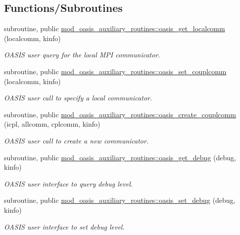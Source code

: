 \subsection*{Functions/\+Subroutines}
\begin{DoxyCompactItemize}
\item 
subroutine, public \hyperlink{namespacemod__oasis__auxiliary__routines_a905dc11bc7613c7ac94054cf92fc2736}{mod\+\_\+oasis\+\_\+auxiliary\+\_\+routines\+::oasis\+\_\+get\+\_\+localcomm} (localcomm, kinfo)
\begin{DoxyCompactList}\small\item\em O\+A\+S\+IS user query for the local M\+PI communicator. \end{DoxyCompactList}\item 
subroutine, public \hyperlink{namespacemod__oasis__auxiliary__routines_a42c3fe19a188de66499094e988c51938}{mod\+\_\+oasis\+\_\+auxiliary\+\_\+routines\+::oasis\+\_\+set\+\_\+couplcomm} (localcomm, kinfo)
\begin{DoxyCompactList}\small\item\em O\+A\+S\+IS user call to specify a local communicator. \end{DoxyCompactList}\item 
subroutine, public \hyperlink{namespacemod__oasis__auxiliary__routines_aede33b301679f532ecd300488358ab71}{mod\+\_\+oasis\+\_\+auxiliary\+\_\+routines\+::oasis\+\_\+create\+\_\+couplcomm} (icpl, allcomm, cplcomm, kinfo)
\begin{DoxyCompactList}\small\item\em O\+A\+S\+IS user call to create a new communicator. \end{DoxyCompactList}\item 
subroutine, public \hyperlink{namespacemod__oasis__auxiliary__routines_a940777065691d5eab0402b0bb40464c7}{mod\+\_\+oasis\+\_\+auxiliary\+\_\+routines\+::oasis\+\_\+get\+\_\+debug} (debug, kinfo)
\begin{DoxyCompactList}\small\item\em O\+A\+S\+IS user interface to query debug level. \end{DoxyCompactList}\item 
subroutine, public \hyperlink{namespacemod__oasis__auxiliary__routines_a71bf70a87b2d4ce86016bbb93d9edd73}{mod\+\_\+oasis\+\_\+auxiliary\+\_\+routines\+::oasis\+\_\+set\+\_\+debug} (debug, kinfo)
\begin{DoxyCompactList}\small\item\em O\+A\+S\+IS user interface to set debug level. \end{DoxyCompactList}\item 

\end{DoxyCompactItemize}
